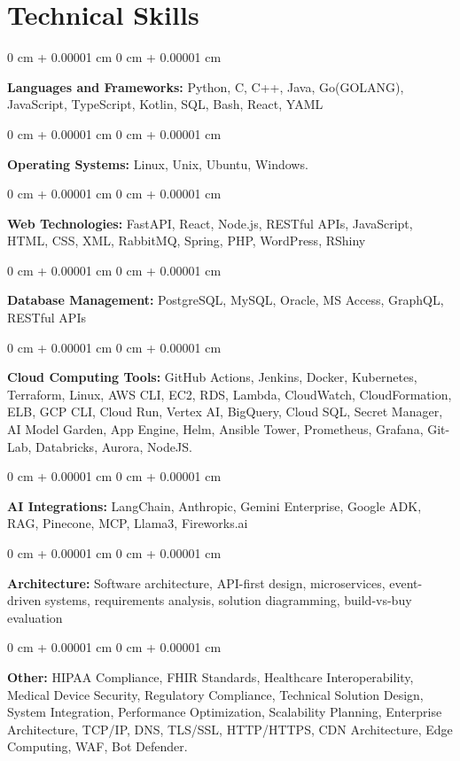 \documentclass[10pt, letterpaper]{article}
\newenvironment{onecolentry}{
    \begin{adjustwidth}{
        0 cm + 0.00001 cm
    }{
        0 cm + 0.00001 cm
    }
}{
    \end{adjustwidth}
} %
\begin{document}
    \section{Technical Skills}
    \vspace{2 pt }
    \begin{onecolentry}
    \textbf{Languages and Frameworks:} Python, C, C++, Java, Go(GOLANG), JavaScript, TypeScript, Kotlin, SQL, Bash, React, YAML
    \end{onecolentry}
    \begin{onecolentry}
        \textbf{Operating Systems:} Linux, Unix, Ubuntu, Windows.
    \end{onecolentry}
    \begin{onecolentry}
         \textbf{Web Technologies:} FastAPI, React, Node.js, RESTful APIs, JavaScript, HTML, CSS, XML, RabbitMQ, Spring, PHP, WordPress, RShiny
    \end{onecolentry}
    \begin{onecolentry}
        \textbf{Database Management:} PostgreSQL, MySQL, Oracle, MS Access, GraphQL, RESTful APIs
    \end{onecolentry}
    \begin{onecolentry}
        \textbf{Cloud Computing Tools:}
GitHub Actions, Jenkins, Docker, Kubernetes, Terraform, Linux, AWS CLI, EC2, RDS, Lambda, CloudWatch, CloudFormation, ELB, GCP CLI, Cloud Run, Vertex AI, BigQuery, Cloud SQL, Secret Manager, AI Model Garden, App Engine, Helm, Ansible Tower, Prometheus, Grafana, Git-Lab, Databricks, Aurora, NodeJS.
    \end{onecolentry}
    \begin{onecolentry}
         \textbf{AI Integrations:} LangChain, Anthropic, Gemini Enterprise, Google ADK, RAG, Pinecone, MCP, Llama3, Fireworks.ai
    \end{onecolentry}
    \begin{onecolentry}
        \textbf{Architecture:} Software architecture, API-first design, microservices, event-driven systems, requirements analysis, solution diagramming, build-vs-buy evaluation
    \end{onecolentry}
        \begin{onecolentry}
     \textbf{Other:} HIPAA Compliance, FHIR Standards, Healthcare Interoperability, Medical Device Security, Regulatory Compliance, Technical Solution Design, System Integration, Performance Optimization, Scalability Planning, Enterprise Architecture, TCP/IP, DNS, TLS/SSL, HTTP/HTTPS, CDN Architecture, Edge Computing, WAF, Bot Defender.
    \end{onecolentry}
\end{document}

